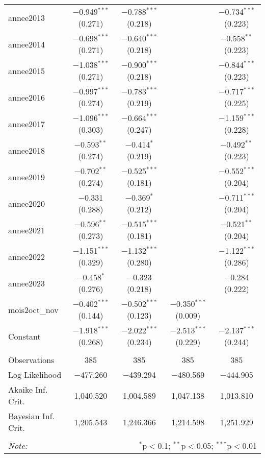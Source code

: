 \begin{table}[!htbp]
\begin{tabular}{@{\extracolsep{5pt}}lcccc}
  annee2013 & $-$0.949$^{***}$ (0.271) & $-$0.788$^{***}$ (0.218) &  & $-$0.734$^{***}$ (0.223) \\ 
  annee2014 & $-$0.698$^{***}$ (0.271) & $-$0.640$^{***}$ (0.218) &  & $-$0.558$^{**}$ (0.223) \\ 
  annee2015 & $-$1.038$^{***}$ (0.271) & $-$0.900$^{***}$ (0.218) &  & $-$0.844$^{***}$ (0.223) \\ 
  annee2016 & $-$0.997$^{***}$ (0.274) & $-$0.783$^{***}$ (0.219) &  & $-$0.717$^{***}$ (0.225) \\ 
  annee2017 & $-$1.096$^{***}$ (0.303) & $-$0.664$^{***}$ (0.247) &  & $-$1.159$^{***}$ (0.228) \\ 
  annee2018 & $-$0.593$^{**}$ (0.274) & $-$0.414$^{*}$ (0.219) &  & $-$0.492$^{**}$ (0.223) \\ 
  annee2019 & $-$0.702$^{**}$ (0.274) & $-$0.525$^{***}$ (0.181) &  & $-$0.552$^{***}$ (0.204) \\ 
  annee2020 & $-$0.331 (0.288) & $-$0.369$^{*}$ (0.212) &  & $-$0.711$^{***}$ (0.204) \\ 
  annee2021 & $-$0.596$^{**}$ (0.273) & $-$0.515$^{***}$ (0.181) &  & $-$0.521$^{**}$ (0.204) \\ 
  annee2022 & $-$1.151$^{***}$ (0.329) & $-$1.132$^{***}$ (0.280) &  & $-$1.122$^{***}$ (0.286) \\ 
  annee2023 & $-$0.458$^{*}$ (0.276) & $-$0.323 (0.218) &  & $-$0.284 (0.222) \\ 
  mois2oct\_nov & $-$0.402$^{***}$ (0.144) & $-$0.502$^{***}$ (0.123) & $-$0.350$^{***}$ (0.009) &  \\ 
  Constant & $-$1.918$^{***}$ (0.268) & $-$2.022$^{***}$ (0.234) & $-$2.513$^{***}$ (0.229) & $-$2.137$^{***}$ (0.244) \\ 
 \hline \\[-1.8ex] 
Observations & 385 & 385 & 385 & 385 \\ 
Log Likelihood & $-$477.260 & $-$439.294 & $-$480.569 & $-$444.905 \\ 
Akaike Inf. Crit. & 1,040.520 & 1,004.589 & 1,047.138 & 1,013.810 \\ 
Bayesian Inf. Crit. & 1,205.543 & 1,246.366 & 1,214.598 & 1,251.929 \\ 
\hline 
\hline \\[-1.8ex] 
\textit{Note:}  & \multicolumn{4}{r}{$^{*}$p$<$0.1; $^{**}$p$<$0.05; $^{***}$p$<$0.01} \\ 
\end{tabular} 
\end{table} 
